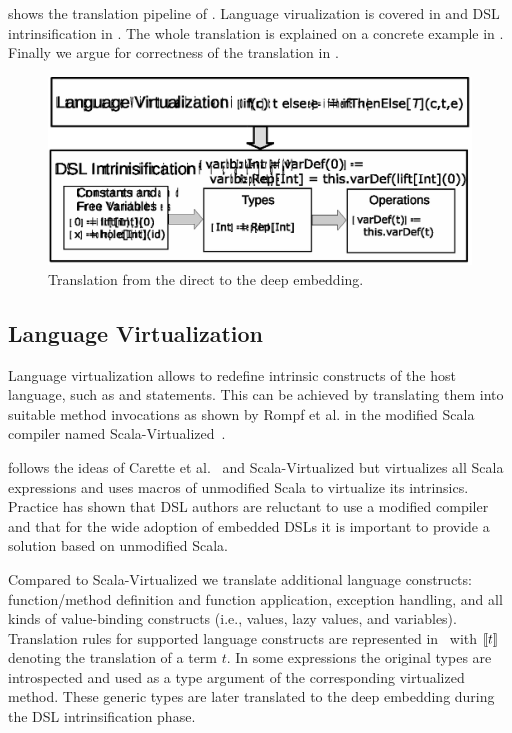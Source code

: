  shows the translation pipeline of \yy. Language virualization is covered
in  and DSL intrinsification
in . The whole translation is explained on a concrete example
in . Finally we argue for correctness of the translation
in .

\begin{figure}[ht]
\centering
\includegraphics{diagrams/pipeline.eps}
\caption{Translation from the direct to the deep embedding.}
\label{fig:pipeline}
\end{figure}

\subsection{Language Virtualization}
\label{sct:langauge-virtualization}
Language virtualization allows to redefine intrinsic constructs of the
host language, such as  and  statements. This can be
achieved by translating them into suitable method invocations as shown by Rompf
et al. in the modified Scala compiler named Scala-Virtualized~\cite{rompf_scala-virtualized:_2009}.

 \yy follows the ideas of Carette et al.~\cite{carette_finally_2009}
 and Scala-Virtualized but virtualizes all Scala expressions and uses macros of
  unmodified Scala to virtualize its intrinsics. Practice has shown that DSL
  authors are reluctant to use a modified compiler and that for the wide adoption
  of embedded DSLs it is important to provide a solution based on unmodified Scala.

 Compared to Scala-Virtualized we translate additional language constructs:
  function/method definition and function application, exception handling, and all kinds of value-binding constructs
  (i.e., values, lazy values, and variables). Translation rules for supported language constructs are
  represented in~ with $\llbracket t \rrbracket$ denoting the translation of a term $t$. In some expressions
  the original types are introspected and used as a type argument of the corresponding virtualized method. These
  generic types are later translated to the deep embedding during the DSL intrinsification phase.


